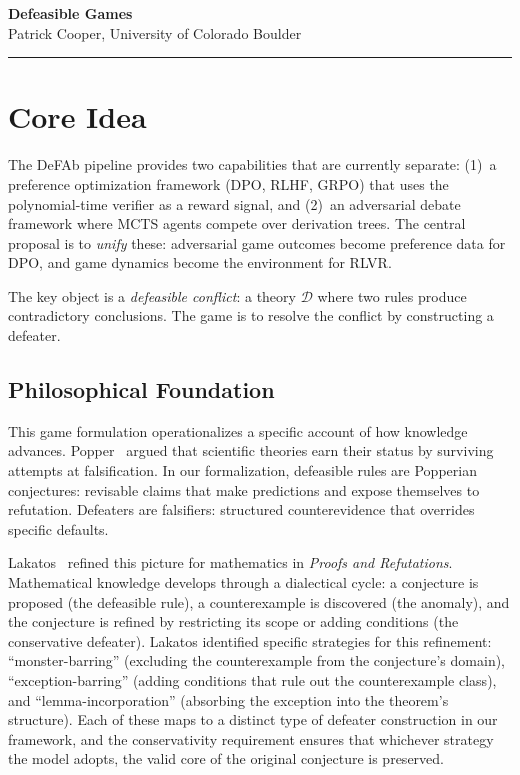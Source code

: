 \documentclass[11pt]{article}
\newcommand{\D}{\mathcal{D}}
\begin{document}
\begin{center}
{\Large\bfseries Defeasible Games}\\[4pt]
{\normalsize Patrick Cooper, University of Colorado Boulder}\\[2pt]
\end{center}

\vspace{-4pt}\hrule\vspace{8pt}

\section{Core Idea}

The DeFAb pipeline provides two capabilities that are currently separate: (1)~a preference optimization framework (DPO, RLHF, GRPO) that uses the polynomial-time verifier as a reward signal, and (2)~an adversarial debate framework where MCTS agents compete over derivation trees. The central proposal is to \emph{unify} these: adversarial game outcomes become preference data for DPO, and game dynamics become the environment for RLVR.

The key object is a \emph{defeasible conflict}: a theory $\D$ where two rules produce contradictory conclusions. The game is to resolve the conflict by constructing a defeater.

\subsection*{Philosophical Foundation}

This game formulation operationalizes a specific account of how knowledge advances. Popper~\cite{popper1959logic} argued that scientific theories earn their status by surviving attempts at falsification. In our formalization, defeasible rules are Popperian conjectures: revisable claims that make predictions and expose themselves to refutation. Defeaters are falsifiers: structured counterevidence that overrides specific defaults.

Lakatos~\cite{lakatos1976proofs} refined this picture for mathematics in \emph{Proofs and Refutations}. Mathematical knowledge develops through a dialectical cycle: a conjecture is proposed (the defeasible rule), a counterexample is discovered (the anomaly), and the conjecture is refined by restricting its scope or adding conditions (the conservative defeater). Lakatos identified specific strategies for this refinement: ``monster-barring'' (excluding the counterexample from the conjecture's domain), ``exception-barring'' (adding conditions that rule out the counterexample class), and ``lemma-incorporation'' (absorbing the exception into the theorem's structure). Each of these maps to a distinct type of defeater construction in our framework, and the conservativity requirement ensures that whichever strategy the model adopts, the valid core of the original conjecture is preserved.
\end{document}
